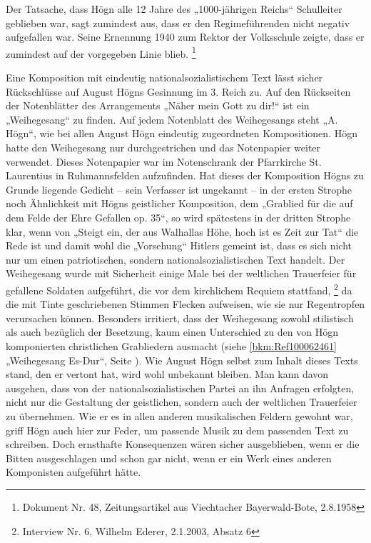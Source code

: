 \documentclass[a4paper]{article}
\begin{document}
Der Tatsache, dass Högn alle 12 Jahre des „1000-jährigen Reichs“
Schulleiter geblieben war, sagt zumindest aus, dass er den
Regimeführenden nicht negativ aufgefallen war. Seine Ernennung 1940 zum
Rektor der Volksschule zeigte, dass er zumindest auf der vorgegeben
Linie blieb. \footnote{Dokument Nr. 48, Zeitungsartikel aus Viechtacher
Bayerwald-Bote, 2.8.1958}

Eine Komposition mit eindeutig nationalsozialistischem Text lässt sicher
Rückschlüsse auf August Högns Gesinnung im 3. Reich zu. Auf den
Rückseiten der Notenblätter des Arrangements „Näher mein Gott zu dir!“
ist ein „Weihegesang“ zu finden. Auf jedem Notenblatt des Weihegesangs
steht „A. Högn“, wie bei allen August Högn eindeutig zugeordneten
Kompositionen. Högn hatte den Weihegesang nur durchgestrichen und das
Notenpapier weiter verwendet. Dieses Notenpapier war im Notenschrank
der Pfarrkirche St. Laurentius in Ruhmannsfelden aufzufinden. Hat
dieses der Komposition Högns zu Grunde liegende Gedicht – sein
Verfasser ist ungekannt – in der ersten Strophe noch Ähnlichkeit mit
Högns geistlicher Komposition, dem „Grablied für die auf dem Felde der
Ehre Gefallen op. 35“, so wird spätestens in der dritten Strophe klar,
wenn von „Steigt ein, der aus Walhallas Höhe, hoch ist es Zeit zur Tat“
die Rede ist und damit wohl die „Vorsehung“ Hitlers gemeint ist, dass
es sich nicht nur um einen patriotischen, sondern
nationalsozialistischen Text handelt. Der Weihegesang wurde mit
Sicherheit einige Male bei der weltlichen Trauerfeier für gefallene
Soldaten aufgeführt, die vor dem kirchlichem Requiem
stattfand, \footnote{Interview Nr. 6, Wilhelm Ederer, 2.1.2003, Absatz
6} da die mit Tinte geschriebenen Stimmen Flecken aufweisen, wie sie
nur Regentropfen verursachen können. Besonders irritiert, dass der
Weihegesang sowohl stilistisch als auch bezüglich der Besetzung, kaum
einen Unterschied zu den von Högn komponierten christlichen Grabliedern
ausmacht (siehe \ref{bkm:Ref100062461} „Weihegesang Es-Dur“, Seite
\pageref{bkm:Ref100062456}). Wie August Högn selbst zum Inhalt dieses
Texts stand, den er vertont hat, wird wohl unbekannt bleiben. Man kann
davon ausgehen, dass von der nationalsozialistischen Partei an ihn
Anfragen erfolgten, nicht nur die Gestaltung der geistlichen, sondern
auch der weltlichen Trauerfeier zu übernehmen. Wie er es in allen
anderen musikalischen Feldern gewohnt war, griff Högn auch hier zur
Feder, um passende Musik zu dem passenden Text zu schreiben. Doch
ernsthafte Konsequenzen wären sicher ausgeblieben, wenn er die Bitten
ausgeschlagen und schon gar nicht, wenn er ein Werk eines anderen
Komponisten aufgeführt hätte.
\end{document}
